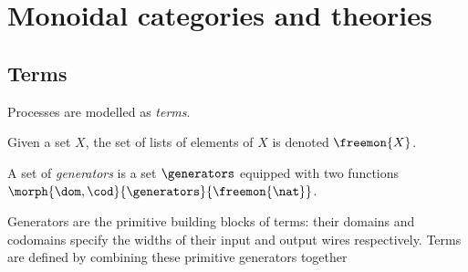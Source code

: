 \chapter{Monoidal categories and theories}

\section{Terms}

Processes are modelled as \emph{terms}.

Given a set \(X\), the set of lists of elements of \(X\) is denoted
\(\freemon{X}\).

\begin{definition}[Generators]
    A set of \emph{generators} is a set \(\generators\) equipped with two functions
    \(\morph{\dom,\cod}{\generators}{\freemon{\nat}}\).
\end{definition}

Generators are the primitive building blocks of terms: their domains and
codomains specify the widths of their input and output wires respectively.
Terms are defined by combining these primitive generators together

